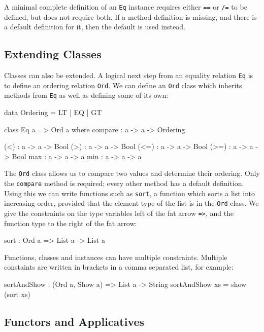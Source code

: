 \noindent
A minimal complete definition of an \texttt{Eq} instance requires either \texttt{==} or \texttt{/=} to be defined, but does not require both.
If a method definition is missing, and there is a default definition for it, then the default is used instead.

\subsection{Extending Classes}

Classes can also be extended.
A logical next step from an equality relation \texttt{Eq} is to define an ordering relation \texttt{Ord}.
We can define an \texttt{Ord} class which inherits methods from \texttt{Eq} as well as defining some of its own:

\begin{code}
data Ordering = LT | EQ | GT
\end{code} 

\begin{code}
class Eq a => Ord a where
    compare : a -> a -> Ordering

    (<) : a -> a -> Bool
    (>) : a -> a -> Bool
    (<=) : a -> a -> Bool
    (>=) : a -> a -> Bool
    max : a -> a -> a
    min : a -> a -> a
\end{code}

\noindent
The \texttt{Ord} class allows us to compare two values and determine their ordering. 
Only the \texttt{compare} method is required; every other method has a default definition.
Using this we can write functions such as \texttt{sort}, a function which sorts a list into increasing order, provided that the element type of the list is in the \texttt{Ord} class.
We give the constraints on the type variables left of the fat arrow \texttt{=>}, and the function type to the right of the fat arrow:

\begin{code}
sort : Ord a => List a -> List a
\end{code}

\noindent
Functions, classes and instances can have multiple constraints.
Multiple constaints are written in brackets in a comma separated list, for example:

\begin{code}
sortAndShow : (Ord a, Show a) => List a -> String
sortAndShow xs = show (sort xs)
\end{code}

\subsection{Functors and Applicatives}

